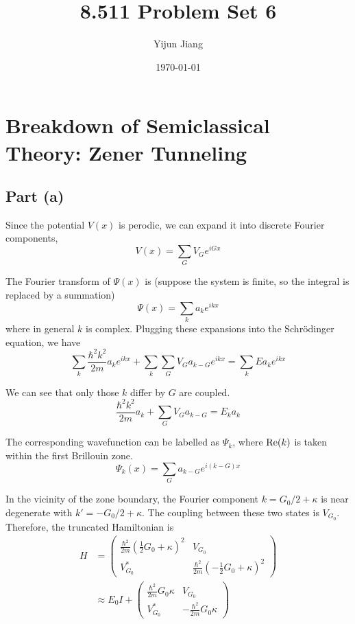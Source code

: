 \documentclass{article}
\title{8.511 Problem Set 6}
\author{Yijun Jiang}
\date{\today}
\begin{document}
\maketitle
\section{Breakdown of Semiclassical Theory: Zener Tunneling}
\subsection{Part (a)}
Since the potential $V(x)$ is perodic, we can expand it into discrete Fourier components,
\begin{equation*}
V(x)=\sum_GV_Ge^{iGx}
\end{equation*}

The Fourier transform of $\Psi(x)$ is (suppose the system is finite, so the integral is replaced by a summation)
\begin{equation*}
\Psi(x)=\sum_ka_ke^{ikx}
\end{equation*}
where in general $k$ is complex. Plugging these expansions into the Schr\"{o}dinger equation, we have
\begin{equation*}
\sum_k\frac{\hbar^2k^2}{2m}a_ke^{ikx}+\sum_k\sum_GV_Ga_{k-G}e^{ikx}=\sum_kEa_ke^{ikx}
\end{equation*}

We can see that only those $k$ differ by $G$ are coupled.
\begin{equation*}
\frac{\hbar^2k^2}{2m}a_k+\sum_GV_Ga_{k-G}=E_ka_k
\end{equation*}

The corresponding wavefunction can be labelled as $\Psi_k$, where $\textup{Re}(k)$ is taken within the first Brillouin zone.
\begin{equation*}
\Psi_k(x)=\sum_Ga_{k-G}e^{i(k-G)x}
\end{equation*}

In the vicinity of the zone boundary, the Fourier component $k=G_0/2+\kappa$ is near degenerate with $k'=-G_0/2+\kappa$. The coupling between these two states is $V_{G_0}$. Therefore, the truncated Hamiltonian is
\begin{align*}
H&=\left(\begin{array}{cc}\frac{\hbar^2}{2m}\left(\frac{1}{2}G_0+\kappa\right)^2&V_{G_0}\\V_{G_0}^*&\frac{\hbar^2}{2m}\left(-\frac{1}{2}G_0+\kappa\right)^2\end{array}\right)\\
&\approx E_0I+\left(\begin{array}{cc}\frac{\hbar^2}{2m}G_0\kappa&V_{G_0}\\V_{G_0}^*&-\frac{\hbar^2}{2m}G_0\kappa\end{array}\right)\\
\end{align*}
\end{document}
